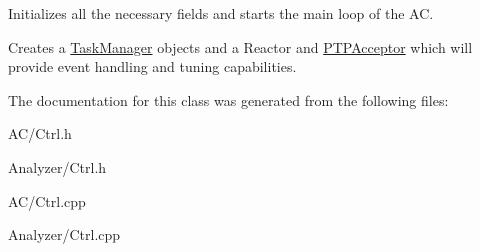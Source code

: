 Initializes all the necessary fields and starts the main loop of the A\-C. 

Creates a \hyperlink{class_task_manager}{Task\-Manager} objects and a Reactor and \hyperlink{class_p_t_p_acceptor}{P\-T\-P\-Acceptor} which will provide event handling and tuning capabilities. 

The documentation for this class was generated from the following files\-:\begin{DoxyCompactItemize}
\item 
A\-C/Ctrl.\-h\item 
Analyzer/Ctrl.\-h\item 
A\-C/Ctrl.\-cpp\item 
Analyzer/Ctrl.\-cpp\end{DoxyCompactItemize}
